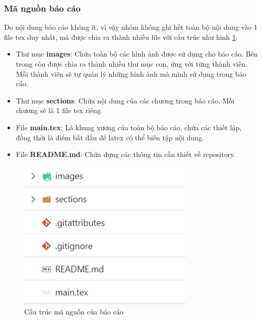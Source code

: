 \subsubsection{Mã nguồn báo cáo}
\noindent Do nội dung báo cáo không ít, vì vậy nhóm không ghi hết toàn bộ nội dung vào 1 file tex duy nhất, mà được chia ra thành nhiều file với cấu trúc như hình \ref{fig:thesis_source_code_structure}:
\begin{itemize}
    \item Thư mục \textbf{images}: Chứa toàn bộ các hình ảnh được sử dụng cho báo cáo. Bên trong còn được chia ra thành nhiều thư mục con, ứng với từng thành viên. Mỗi thành viên sẽ tự quản lý những hỉnh ảnh mà mình sử dụng trong báo cáo.
    \item Thư mục \textbf{sections}: Chứa nội dung của các chương trong báo cáo. Mỗi chương sẽ là 1 file tex riêng.
    \item File \textbf{main.tex}: Là khung xương của toàn bộ báo cáo, chứa các thiết lập, đồng thời là điểm bắt đầu để latex có thể biên tập nội dung.
    \item File \textbf{README.md}: Chứa đựng các thông tin cần thiết về repository. 
\end{itemize}
\begin{figure}[H]
    \begin{center}
        \includegraphics[scale = 1.5]{images/hanh/thesis-source-code-screenshot.png}
        \vspace*{2mm}
    \end{center}
    \caption{Cấu trúc mã nguồn của báo cáo}
    \label{fig:thesis_source_code_structure}

\end{figure}
